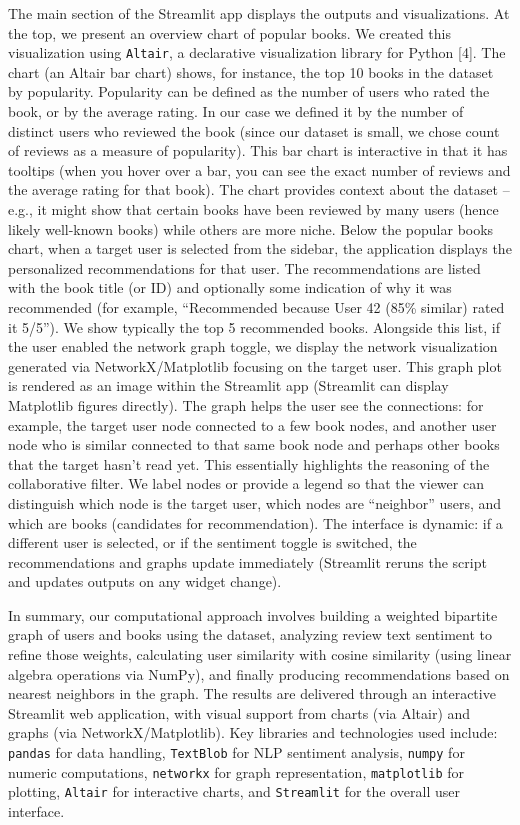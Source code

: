 \documentclass[11pt]{article}
\begin{document}
The main section of the Streamlit app displays the outputs and visualizations. At the top, we present an overview chart of popular books. We created this visualization using \texttt{Altair}, a declarative visualization library for Python [4]. The chart (an Altair bar chart) shows, for instance, the top 10 books in the dataset by popularity. Popularity can be defined as the number of users who rated the book, or by the average rating. In our case we defined it by the number of distinct users who reviewed the book (since our dataset is small, we chose count of reviews as a measure of popularity). This bar chart is interactive in that it has tooltips (when you hover over a bar, you can see the exact number of reviews and the average rating for that book). The chart provides context about the dataset – e.g., it might show that certain books have been reviewed by many users (hence likely well-known books) while others are more niche. Below the popular books chart, when a target user is selected from the sidebar, the application displays the personalized recommendations for that user. The recommendations are listed with the book title (or ID) and optionally some indication of why it was recommended (for example, “Recommended because User 42 (85\% similar) rated it 5/5”). We show typically the top 5 recommended books. Alongside this list, if the user enabled the network graph toggle, we display the network visualization generated via NetworkX/Matplotlib focusing on the target user. This graph plot is rendered as an image within the Streamlit app (Streamlit can display Matplotlib figures directly). The graph helps the user see the connections: for example, the target user node connected to a few book nodes, and another user node who is similar connected to that same book node and perhaps other books that the target hasn’t read yet. This essentially highlights the reasoning of the collaborative filter. We label nodes or provide a legend so that the viewer can distinguish which node is the target user, which nodes are “neighbor” users, and which are books (candidates for recommendation). The interface is dynamic: if a different user is selected, or if the sentiment toggle is switched, the recommendations and graphs update immediately (Streamlit reruns the script and updates outputs on any widget change).

In summary, our computational approach involves building a weighted bipartite graph of users and books using the dataset, analyzing review text sentiment to refine those weights, calculating user similarity with cosine similarity (using linear algebra operations via NumPy), and finally producing recommendations based on nearest neighbors in the graph. The results are delivered through an interactive Streamlit web application, with visual support from charts (via Altair) and graphs (via NetworkX/Matplotlib). Key libraries and technologies used include: \texttt{pandas} for data handling, \texttt{TextBlob} for NLP sentiment analysis, \texttt{numpy} for numeric computations, \texttt{networkx} for graph representation, \texttt{matplotlib} for plotting, \texttt{Altair} for interactive charts, and \texttt{Streamlit} for the overall user interface.
\end{document}
